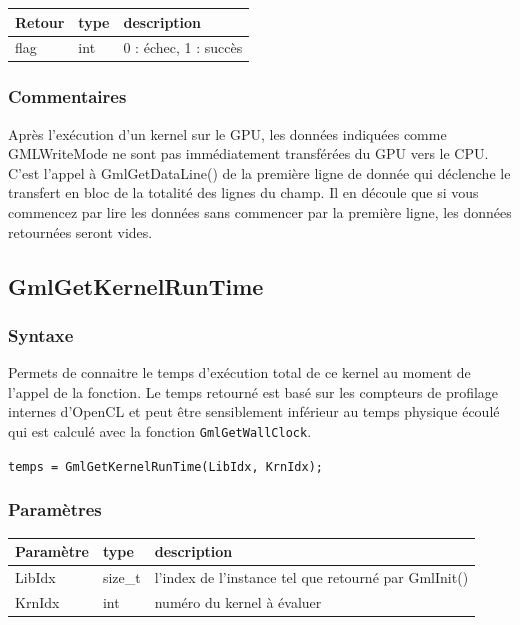 \documentclass[a4paper,12pt]{article}
\begin{document}
\medskip

\begin{tabular}{|m{2cm}|m{1.5cm}|m{10.5cm}|}
\hline
Retour     & type   & description \\
\hline
flag       & int    & 0 : échec, 1 : succès \\
\hline
\end{tabular}

\subsubsection*{Commentaires}
Après l'exécution d'un kernel sur le GPU, les données indiquées comme GMLWriteMode ne sont pas immédiatement transférées du GPU vers le CPU.
C'est l'appel à GmlGetDataLine() de la première ligne de donnée qui déclenche le transfert en bloc de la totalité des lignes du champ.
Il en découle que si vous commencez par lire les données sans commencer par la première ligne, les données retournées seront vides.


\subsection{GmlGetKernelRunTime}

\subsubsection*{Syntaxe}

Permets de connaitre le temps d'exécution total de ce kernel au moment de l'appel de la fonction.
Le temps retourné est basé sur les compteurs de profilage internes d'OpenCL et peut être sensiblement inférieur au temps physique écoulé qui est calculé avec la fonction {\tt GmlGetWallClock}.

{\tt temps = GmlGetKernelRunTime(LibIdx, KrnIdx);}

\subsubsection*{Paramètres}

\begin{tabular}{|m{2cm}|m{1.5cm}|m{10.5cm}|}
\hline
Paramètre  & type    & description \\
\hline
LibIdx     & size\_t & l'index de l'instance tel que retourné par GmlInit() \\
\hline
KrnIdx     & int     & numéro du kernel à évaluer \\
\hline
\end{tabular}
\end{document}
